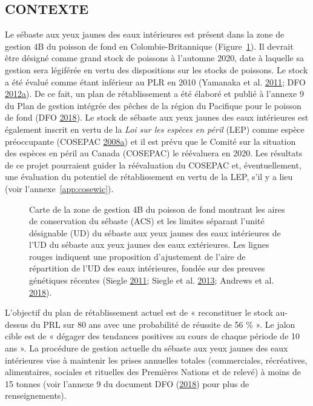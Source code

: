 \documentclass[french,11pt]{book}
\begin{document}
\hypertarget{sec:introduction-background}{%
\subsection{CONTEXTE}\label{sec:introduction-background}}

Le sébaste aux yeux jaunes des eaux intérieures est présent dans la zone de gestion 4B du poisson de fond en Colombie-Britannique (Figure~\ref{fig:map-4B}). Il devrait être désigné comme grand stock de poissons à l'automne 2020, date à laquelle sa gestion sera légiférée en vertu des dispositions sur les stocks de poissons. Le stock a été évalué comme étant inférieur au PLR en 2010 (Yamanaka et al. \protect\hyperlink{ref-yamanaka2011}{2011}; DFO \protect\hyperlink{ref-dfo2012}{2012}\protect\hyperlink{ref-dfo2012}{a}). De ce fait, un plan de rétablissement a été élaboré et publié à l'annexe 9 du Plan de gestion intégrée des pêches de la région du Pacifique pour le poisson de fond (DFO \protect\hyperlink{ref-ifmp2018}{2018}). Le stock de sébaste aux yeux jaunes des eaux intérieures est également inscrit en vertu de la \emph{Loi sur les espèces en péril} (LEP) comme espèce préoccupante (COSEPAC \protect\hyperlink{ref-cosewic2008}{2008}\protect\hyperlink{ref-cosewic2008}{a}) et il est prévu que le Comité sur la situation des espèces en péril au Canada (COSEPAC) le réévaluera en 2020. Les résultats de ce projet pourraient guider la réévaluation du COSEPAC et, éventuellement, une évaluation du potentiel de rétablissement en vertu de la LEP, s'il y a lieu (voir l'annexe~\ref{app:cosewic}).


\begin{figure}[htb]

{\centering {} 

}

\caption{Carte de la zone de gestion 4B du poisson de fond montrant les aires de conservation du sébaste (ACS) et les limites séparant l'unité désignable (UD) du sébaste aux yeux jaunes des eaux intérieures de l'UD du sébaste aux yeux jaunes des eaux extérieures. Les lignes rouges indiquent une proposition d'ajustement de l'aire de répartition de l'UD des eaux intérieures, fondée sur des preuves génétiques récentes (Siegle \protect\hyperlink{ref-siegle2011}{2011}; Siegle et al. \protect\hyperlink{ref-siegle2013}{2013}; Andrews et al. \protect\hyperlink{ref-andrews2018}{2018}).}\label{fig:map-4B}
\end{figure}
L'objectif du plan de rétablissement actuel est de « reconstituer le stock au-dessus du PRL sur 80 ans avec une probabilité de réussite de 56 \% ». Le jalon cible est de « dégager des tendances positives au cours de chaque période de 10 ans ». La procédure de gestion actuelle du sébaste aux yeux jaunes des eaux intérieures vise à maintenir les prises annuelles totales (commerciales, récréatives, alimentaires, sociales et rituelles des Premières Nations et de relevé) à moins de 15 tonnes (voir l'annexe 9 du document DFO (\protect\hyperlink{ref-ifmp2018}{2018}) pour plus de renseignements).
\end{document}
